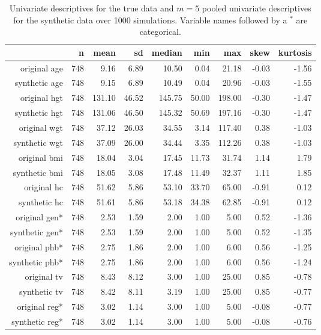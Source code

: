 \documentclass[psych,article,submit,moreauthors,pdftex]{mdpi}
\begin{document}
\begin{table}[ht]
\caption{Univariate descriptives for the true data and $m=5$ pooled univariate descriptives for the synthetic data over 1000 simulations. Variable names followed by a $^*$ are categorical.}
\centering
\begin{tabular}{rrrrrrrrr}
  \hline
 & n & mean & sd & median & min & max & skew & kurtosis \\ 
  \hline
original age & 748 & 9.16 & 6.89 & 10.50 & 0.04 & 21.18 & -0.03 & -1.56 \\ 
  synthetic age & 748 & 9.15 & 6.89 & 10.49 & 0.04 & 20.96 & -0.03 & -1.55 \\ 
  original hgt & 748 & 131.10 & 46.52 & 145.75 & 50.00 & 198.00 & -0.30 & -1.47 \\ 
  synthetic hgt & 748 & 131.06 & 46.50 & 145.32 & 50.69 & 197.16 & -0.30 & -1.47 \\ 
  original wgt & 748 & 37.12 & 26.03 & 34.55 & 3.14 & 117.40 & 0.38 & -1.03 \\ 
  synthetic wgt & 748 & 37.09 & 26.00 & 34.44 & 3.35 & 112.26 & 0.38 & -1.03 \\ 
  original bmi & 748 & 18.04 & 3.04 & 17.45 & 11.73 & 31.74 & 1.14 & 1.79 \\ 
  synthetic bmi & 748 & 18.05 & 3.08 & 17.48 & 11.49 & 32.37 & 1.11 & 1.85 \\ 
  original hc & 748 & 51.62 & 5.86 & 53.10 & 33.70 & 65.00 & -0.91 & 0.12 \\ 
  synthetic hc & 748 & 51.61 & 5.86 & 53.18 & 34.38 & 62.85 & -0.91 & 0.12 \\ 
  original gen* & 748 & 2.53 & 1.59 & 2.00 & 1.00 & 5.00 & 0.52 & -1.36 \\ 
  synthetic gen* & 748 & 2.53 & 1.59 & 2.00 & 1.00 & 5.00 & 0.52 & -1.35 \\ 
  original phb* & 748 & 2.75 & 1.86 & 2.00 & 1.00 & 6.00 & 0.56 & -1.25 \\ 
  synthetic phb* & 748 & 2.75 & 1.86 & 2.00 & 1.00 & 6.00 & 0.56 & -1.24 \\ 
  original tv & 748 & 8.43 & 8.12 & 3.00 & 1.00 & 25.00 & 0.85 & -0.78 \\ 
  synthetic tv & 748 & 8.42 & 8.11 & 3.19 & 1.00 & 25.00 & 0.85 & -0.77 \\ 
  original reg* & 748 & 3.02 & 1.14 & 3.00 & 1.00 & 5.00 & -0.08 & -0.77 \\ 
  synthetic reg* & 748 & 3.02 & 1.14 & 3.00 & 1.00 & 5.00 & -0.08 & -0.76 \\ 
   \hline
\end{tabular}
\end{table}
\end{document}
